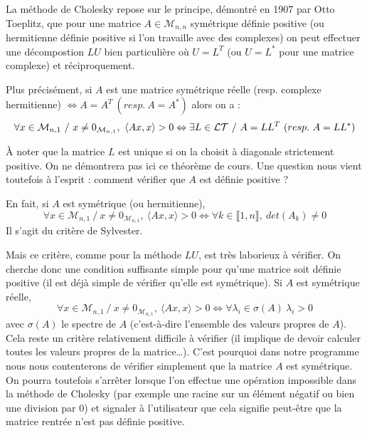 \documentclass[a4paper, titlepage]{livret}													%
\begin{document}
			La méthode de Cholesky repose sur le principe, démontré en 1907 par Otto Toeplitz, que pour une matrice $A \in \mathcal{M}_{n,n}$ symétrique définie positive (ou hermitienne définie positive si l'on travaille avec des complexes) on peut effectuer une décompostion $LU$ bien particulière où $U = L^{T}$ (ou $U = L^{*}$ pour une matrice complexe) et réciproquement.
				
			Plus précisément, si $A$ est une matrice symétrique réelle (resp. complexe hermitienne) $\Leftrightarrow A = A^{T} \ (resp. \ A = A^{*})$ alors on a :
				\[
					\forall x \in \mathcal{M}_{n,1} \ / \ x \neq 0_{\mathcal{M}_{n,1}}, \ \langle Ax, x \rangle > 0 \\
					\Leftrightarrow
					\exists L \in \mathcal{LT} \ / \ A = LL^{T} \ (resp. \ A = LL^{*})
				\]

			À noter que la matrice $L$ est unique si on la choisit à diagonale strictement positive.
			On ne démontrera pas ici ce théorème de cours.
			Une question nous vient toutefois à l'esprit : comment vérifier que $A$ est définie positive ?
			
			En fait, si $A$ est symétrique (ou hermitienne), 
				\[ 
					\forall x \in \mathcal{M}_{n,1} \ / \ x \neq 0_{\mathcal{M}_{n,1}}, \ \langle Ax, x \rangle > 0
					\Leftrightarrow
					\forall k \in \llbracket 1,n \rrbracket, \ det(A_{k}) \neq 0
				\]
			Il s'agit du critère de Sylvester.

			Mais ce critère, comme pour la méthode $LU$, est très laborieux à vérifier. On cherche donc une condition suffisante simple pour qu'une matrice soit définie positive (il est déjà simple de vérifier qu'elle est symétrique).
			Si $A$ est symétrique réelle,
				\[ 
					\forall x \in \mathcal{M}_{n,1} \ / \ x \neq 0_{\mathcal{M}_{n,1}}, \ \langle Ax, x \rangle > 0
					\Leftrightarrow
					\forall \lambda_{i} \in \sigma(A) \ \lambda_{i} > 0
				\]
			avec $\sigma(A)$ le spectre de $A$ (c'est-à-dire l'ensemble des valeurs propres de $A$).
			Cela reste un critère relativement difficile à vérifier (il implique de devoir calculer toutes les valeurs propres de la matrice…).
			C'est pourquoi dans notre programme nous nous contenterons de vérifier simplement que la matrice $A$ est symétrique.
			On pourra toutefois s'arrêter lorsque l'on effectue une opération impossible dans la méthode de Cholesky (par exemple une racine sur un élément négatif ou bien une division par $0$) et signaler à l'utilisateur que cela signifie peut-être que la matrice rentrée n'est pas définie positive.
\end{document}
